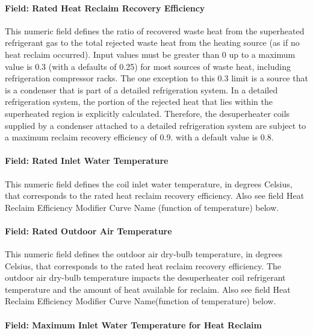 \paragraph{Field: Rated Heat Reclaim Recovery Efficiency}\label{field-rated-heat-reclaim-recovery-efficiency}

This numeric field defines the ratio of recovered waste heat from the superheated refrigerant gas to the total rejected waste heat from the heating source (as if no heat reclaim occurred). Input values must be greater than 0 up to a maximum value is 0.3 (with a defaults of 0.25) for most sources of waste heat, including refrigeration compressor racks. The one exception to this 0.3 limit is a source that is a condenser that is part of a detailed refrigeration system. In a detailed refrigeration system, the portion of the rejected heat that lies within the superheated region is explicitly calculated. Therefore, the desuperheater coils supplied by a condenser attached to a detailed refrigeration system are subject to a maximum reclaim recovery efficiency of 0.9. with a default value is 0.8.

\paragraph{Field: Rated Inlet Water Temperature}\label{field-rated-inlet-water-temperature-1}

This numeric field defines the coil inlet water temperature, in degrees Celsius, that corresponds to the rated heat reclaim recovery efficiency. Also see field Heat Reclaim Efficiency Modifier Curve Name (function of temperature) below.

\paragraph{Field: Rated Outdoor Air Temperature}\label{field-rated-outdoor-air-temperature}

This numeric field defines the outdoor air dry-bulb temperature, in degrees Celsius, that corresponds to the rated heat reclaim recovery efficiency. The outdoor air dry-bulb temperature impacts the desuperheater coil refrigerant temperature and the amount of heat available for reclaim. Also see field Heat Reclaim Efficiency Modifier Curve Name(function of temperature) below.

\paragraph{Field: Maximum Inlet Water Temperature for Heat Reclaim}\label{field-maximum-inlet-water-temperature-for-heat-reclaim}

